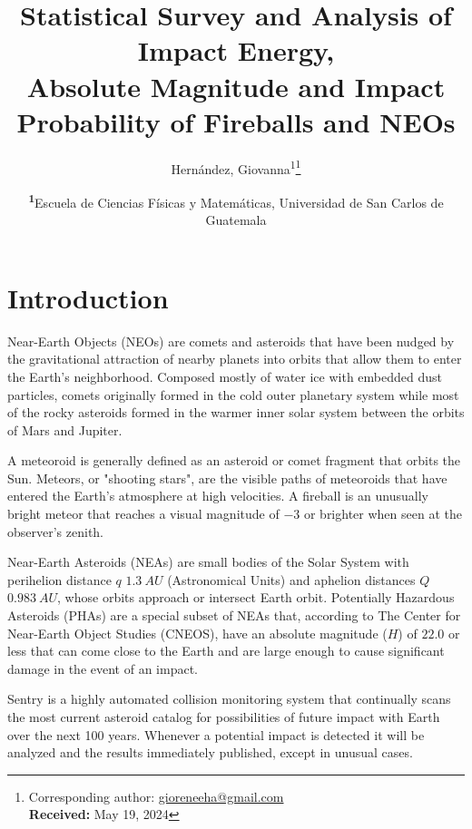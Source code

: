 \documentclass[
	a4paper, %
	10pt, %
	unnumberedsections, %
	twoside, %
]{LTJournalArticle}
\title{Statistical Survey and Analysis of Impact Energy,\\ Absolute Magnitude and Impact Probability of Fireballs and NEOs} %
\author{%
	Hernández, Giovanna\textsuperscript{1}\thanks{Corresponding author: \href{mailto:gioreneeha@gmail.com}{gioreneeha@gmail.com}\\ \textbf{Received:} May 19, 2024}
}
\date{\footnotesize\textsuperscript{\textbf{1}}Escuela de Ciencias Físicas y Matemáticas, Universidad de San Carlos de Guatemala}
\begin{document}
\maketitle %


\section{Introduction}

Near-Earth Objects (NEOs) are comets and asteroids that have been nudged by the gravitational
attraction of nearby planets into orbits that allow them to enter the Earth’s neighborhood. Composed
mostly of water ice with embedded dust particles, comets originally formed in the cold outer planetary
system while most of the rocky asteroids formed in the warmer inner solar system between the orbits of
Mars and Jupiter.  \supercite{nasaBasics}

A meteoroid is generally defined as an asteroid or comet fragment that orbits the Sun. Meteors, or
"shooting stars", are the visible paths of meteoroids that have entered the Earth’s atmosphere at high
velocities. A fireball is an unusually bright meteor that reaches a visual magnitude of $-3$ or
brighter when seen at the observer’s zenith. \supercite{nasaFireballs}

Near-Earth Asteroids (NEAs) are small bodies of the Solar System with perihelion distance $q$
$1.3\:AU$ (Astronomical Units) and aphelion distances $Q$ $0.983\:AU$, whose orbits approach or
intersect Earth orbit. \supercite{rukmini2016statistical} Potentially Hazardous Asteroids (PHAs) are a
special subset of NEAs that, according to The Center for Near-Earth Object Studies (CNEOS), have an
absolute magnitude ($H$) of $22.0$ or less that can come close to the Earth and are large enough to
cause significant damage in the event of an impact. \supercite{zhou2024martians}

Sentry is a highly automated collision monitoring system that continually scans the most current
asteroid catalog for possibilities of future impact with Earth over the next 100 years. Whenever a
potential impact is detected it will be analyzed and the results immediately published, except in
unusual cases. \supercite{nasaSentryEarth}

\vspace{-5pt}
\end{document}
